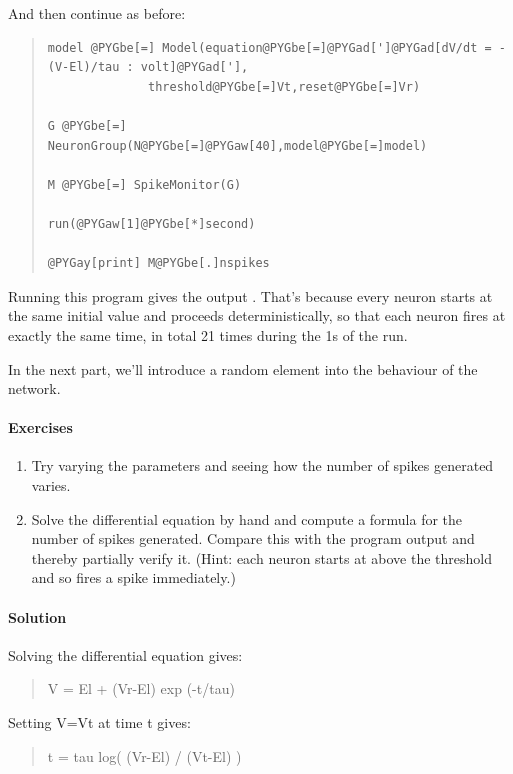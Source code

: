 \documentclass[letterpaper,10pt]{manual}
\begin{document}
And then continue as before:
\begin{quote}

\begin{Verbatim}[commandchars=@\[\]]
model @PYGbe[=] Model(equation@PYGbe[=]@PYGad[']@PYGad[dV/dt = -(V-El)/tau : volt]@PYGad['],
              threshold@PYGbe[=]Vt,reset@PYGbe[=]Vr)

G @PYGbe[=] NeuronGroup(N@PYGbe[=]@PYGaw[40],model@PYGbe[=]model)

M @PYGbe[=] SpikeMonitor(G)

run(@PYGaw[1]@PYGbe[*]second)

@PYGay[print] M@PYGbe[.]nspikes
\end{Verbatim}
\end{quote}

Running this program gives the output . That's because
every neuron starts at the same initial value and proceeds
deterministically, so that each neuron fires at exactly the
same time, in total 21 times during the 1s of the run.

In the next part, we'll introduce a random element into the
behaviour of the network.


\paragraph{Exercises}
\begin{enumerate}
\item {} 
Try varying the parameters and seeing how the number of
spikes generated varies.

\item {} 
Solve the differential equation by hand and compute a
formula for the number of spikes generated. Compare this
with the program output and thereby partially verify it.
(Hint: each neuron starts at above the threshold and so
fires a spike immediately.)

\end{enumerate}


\paragraph{Solution}

Solving the differential equation gives:
\begin{quote}

V = El + (Vr-El) exp (-t/tau)
\end{quote}

Setting V=Vt at time t gives:
\begin{quote}

t = tau log( (Vr-El) / (Vt-El) )
\end{quote}
\end{document}

